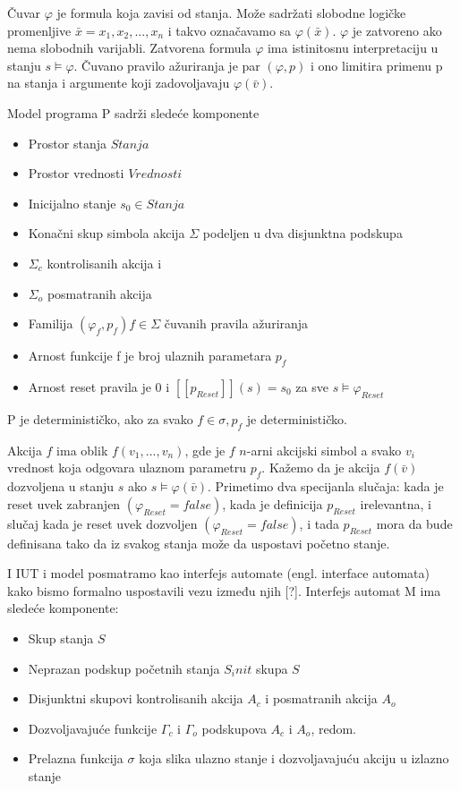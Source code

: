 \documentclass[a4paper]{article}
\begin{document}
Čuvar $\varphi$ je formula koja zavisi od stanja. Može sadržati slobodne logičke promenljive $\bar{x} = x_1, x_2,..., x_n$ i takvo označavamo sa $\varphi(\bar{x})$. $\varphi$ je zatvoreno ako nema slobodnih varijabli. Zatvorena formula $\varphi$ ima istinitosnu interpretaciju u stanju $s \models \varphi$. Čuvano pravilo ažuriranja je par $(\varphi, p)$ i ono limitira primenu p na stanja i argumente koji zadovoljavaju $\varphi(\bar{v})$.


Model programa P sadrži sledeće komponente
\begin{itemize}
\item Prostor stanja $Stanja$
\item Prostor vrednosti $Vrednosti$
\item Inicijalno stanje $s_0 \in Stanja$
\item Konačni skup simbola akcija $\Sigma$ podeljen u dva disjunktna podskupa
	\item $\Sigma_c$ kontrolisanih akcija i
	\item $\Sigma_o$ posmatranih akcija
\item Familija $(\varphi_f, p_f) f \in \Sigma$ čuvanih pravila ažuriranja
	\item Arnost funkcije f je broj ulaznih parametara $p_f$
	\item Arnost reset pravila je 0 i $[[p_{Reset}]](s) = s_0$ za sve $s \models \varphi_{Reset}$
\end{itemize}
P je determinističko, ako za svako $f \in \sigma, p_f$ je determinističko.


Akcija $f$ ima oblik $f(v_1,...,v_n)$, gde je $f$ $n$-arni akcijski simbol a svako $v_i$ vrednost koja odgovara ulaznom parametru $p_f$. Kažemo da je akcija $f(\bar{v})$ dozvoljena u stanju $s$ ako $s \models \varphi(\bar{v})$. Primetimo dva specijanla slučaja: kada je reset uvek zabranjen $(\varphi_{Reset} = false)$, kada je definicija $p_{Reset}$ irelevantna, i slučaj kada je reset uvek dozvoljen $(\varphi_{Reset} = false)$, i tada $p_{Reset}$ mora da bude definisana tako da iz svakog stanja može da uspostavi početno stanje.

I IUT i model posmatramo kao interfejs automate (engl. interface automata) kako bismo formalno uspostavili vezu između njih [?]. %
Interfejs automat M ima sledeće komponente:
\begin{itemize}
\item Skup stanja $S$
\item Neprazan podskup početnih stanja $S_init$ skupa $S$
\item Disjunktni skupovi kontrolisanih akcija $A_c$ i posmatranih akcija $A_o$
\item Dozvoljavajuće funkcije $\Gamma_c$ i $\Gamma_o$ podskupova $A_c$ i $A_o$, redom.
\item Prelazna funkcija $\sigma$ koja slika ulazno stanje i dozvoljavajuću akciju u izlazno stanje
\end{itemize}
\end{document}
